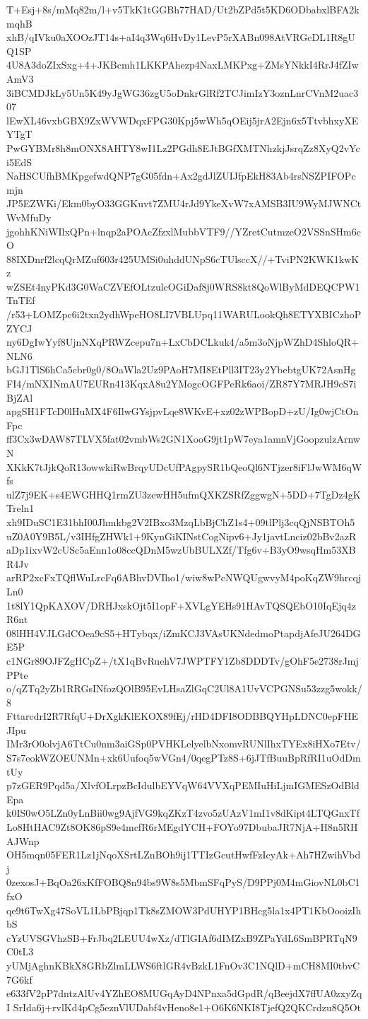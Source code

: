 T+Esj+8s/mMq82m/l+v5TkK1tGGBh77HAD/Ut2bZPd5t5KD6ODbabxlBFA2kmqhB
xhB/qIVku0aXOOzJT14s+aI4q3Wq6HvDy1LevP5rXABn098AtVRGcDL1R8gUQ1SP
4U8A3doZIxSxg+4+JKBcmh1LKKPAhezp4NaxLMKPxg+ZMsYNkkI4RrJ4fZIwAmV3
3iBCMDJkLy5Un5K49yJgWG36zgU5oDnkrGlRf2TCJimIzY3oznLnrCVnM2uac307
lEwXL46vxbGBX9ZxWVWDqxFPG30Kpj5wWh5qOEij5jrA2Ejn6x5TtvbhxyXEYTgT
PwGYBMr8h8mONX8AHTY8wI1Lz2PGdh8EJtBGfXMTNhzkjJsrqZz8XyQ2vYci5EdS
NaHSCUfhBMKpgefwdQNP7gG05fdn+Ax2gdJlZUIJfpEkH83Ab4rsNSZPIFOPcmjn
JP5EZWKi/Ekm0byO33GGKuvt7ZMU4rJd9YkeXvW7xAMSB3IU9WyMJWNCtWvMfuDy
jgohhKNiWIlxQPn+lnqp2aPOAcZfzxlMubbVTF9//YZretCutmzeO2VSSnSHm6cO
88IXDnrf2lcqQrMZuf603r425UMSi0uhddUNpS6cTUlsccX//+TviPN2KWK1kwKz
wZSEt4nyPKd3G0WaCZVEfOLtzulcOGiDaf8j0WRS8kt8QoWlByMdDEQCPW1TnTEf
/r53+LOMZpc6i2txn2ydhWpeHO8LI7VBLUpq11WARULookQh8ETYXBICzhoPZYCJ
ny6DgIwYyf8UjnNXqPRWZcepu7n+LxCbDCLkuk4/a5m3oNjpWZhD4ShloQR+NLN6
bGJ1TlS6hCa5cbr0g0/8OaWla2Uz9PAoH7MI8EtPll3IT23y2YbebtgUK72AsnHg
FI4/mNXINmAU7EURn413KqxA8u2YMogcOGFPeRk6aoi/ZR87Y7MRJH9cS7iBjZAl
apgSH1FTcD0lHuMX4F6IlwGYsjpvLqe8WKvE+xz02zWPBopD+zU/Ig0wjCtOnFpc
ff3Cx3wDAW87TLVX5fat02vmbWs2GN1XooG9jt1pW7eya1amnVjGoopzulzArnwN
XKkK7tJjkQoR13owwkiRwBrqyUDcUfPAgpySR1bQeoQl6NTjzer8iFlJwWM6qWfs
ulZ7j9EK+s4EWGHHQ1rmZU3zewHH5ufmQXKZSRfZggwgN+5DD+7TgDz4gKTreln1
xh9IDuSC1E31bhI00Jhmkbg2V2IBxo3MzqLbBjChZ1s4+09tlPlj3cqQjNSBTOh5
uZ0A0Y9B5L/v3IHfgZHWk1+9KynGiKINstCogNipv6+Jy1javtLnciz02bBv2azR
aDp1ixvW2cUSc5aEnn1o08ccQDnM5wzUbBULXZf/Tfg6v+B3yO9wsqHm53XBR4Jv
arRP2xcFxTQflWuLrcFq6ABhvDVIho1/wiw8wPcNWQUgwvyM4poKqZW9hrcqjLn0
1t8lY1QpKAXOV/DRHJxskOjt5I1opF+XVLgYEHs91HAvTQSQEbO10IqEjq4zR6nt
08lHH4VJLGdCOea9cS5+HTybqx/iZmKCJ3VAsUKNdedmoPtapdjAfeJU264DGE5P
c1NGr89OJFZgHCpZ+/tX1qBvRuehV7JWPTFY1Zb8DDDTv/gOhF5e2738rJmjPPte
o/qZTq2yZb1RRGsINfozQOlB95EvLHsaZlGqC2Ul8A1UvVCPGNSu53zzg5wokk/8
FttarcdrI2R7RfqU+DrXgkKlEKOX89fEj/rHD4DFI8ODBBQYHpLDNC0epFHEJIpu
IMr3rO0olvjA6TtCu0nm3aiGSp0PVHKLelyelbNxomvRUNlIhxTYEx8iHXo7Etv/
S7s7eokWZOEUNMn+xk6Uufoq5wVGn4/0qegPTz8S+6jJTfBuuBpRfRI1uOdDmtUy
p7zGER9Pqd5a/XlvfOLrpzBcIdulbEYVqW64VVXqPEMIuHiLjmIGMESzOdBldEpa
k0IS0wO5LZn0yLnBii0wg9AjfVG9kqZKzT4zvo5zUAzV1mI1v8dKipt4LTQGnxTf
Lo8HtHAC9Zt8OK86pS9e4mcfR6rMEgdYCH+FOYo97DbubaJR7NjA+H8n5RHAJWnp
OH5mqn05FER1Lz1jNqoXSrtLZnBOh9ij1TTIzGcutHwfFzIcyAk+Ah7HZwihVbdj
0zexosJ+BqOa26xKfFOBQ8n94bs9W8s5MbmSFqPyS/D9PPj0M4mGiovNL0bC1fxO
qe9t6TwXg47SoVL1LbPBjqp1Tk8sZMOW3PdUHYP1BHcg5la1x4PT1KbOooizIhbS
cYzUVSGVhzSB+FrJbq2LEUU4wXz/dTlGIAf6dIMZxB9ZPaYdL6SmBPRTqN9C0tL3
yUMjAghnKBkX8GRbZlmLLWS6ftlGR4vBzkL1FnOv3C1NQlD+mCH8MI0tbvC7G6kf
e633fV2pP7dntzAlUv4YZhEO8MUGqAyD4NPnxa5dGpdR/qBeejdX7ffUA0zxyZqI
SrIda6j+rvlKd4pCg5eznVlUDabf4vHeno8e1+O6K6NKI8TjefQ2QKCrdzu8Q5Ot
